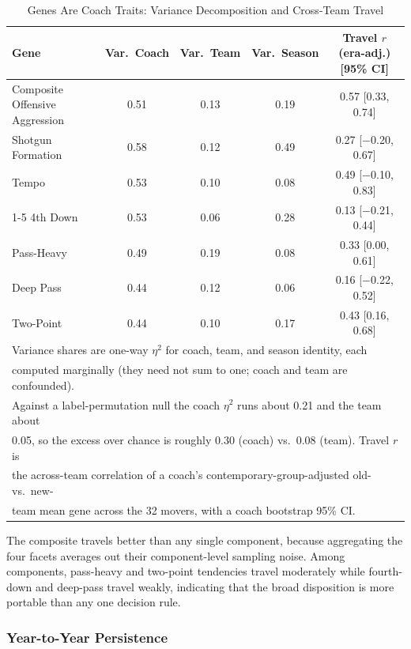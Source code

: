\documentclass[USenglish]{article}
\theoremstyle{dgthm}
\theoremstyle{dgdef}
\begin{document}
\begin{table}[H]
\caption{Genes Are Coach Traits: Variance Decomposition and Cross-Team Travel}
\label{tab:variance}
\begin{tabular}{lcccc}
\toprule
\textbf{Gene} & \textbf{Var.\ Coach} & \textbf{Var.\ Team} & \textbf{Var.\ Season} & \textbf{Travel $r$ (era-adj.) [95\% CI]} \\
\midrule
Composite Offensive Aggression & 0.51 & 0.13 & 0.19 & 0.57 [0.33, 0.74] \\
Shotgun Formation & 0.58 & 0.12 & 0.49 & 0.27 [$-$0.20, 0.67] \\
Tempo & 0.53 & 0.10 & 0.08 & 0.49 [$-$0.10, 0.83] \\
\cmidrule{1-5}
4th Down & 0.53 & 0.06 & 0.28 & 0.13 [$-$0.21, 0.44] \\
Pass-Heavy & 0.49 & 0.19 & 0.08 & 0.33 [0.00, 0.61] \\
Deep Pass & 0.44 & 0.12 & 0.06 & 0.16 [$-$0.22, 0.52] \\
Two-Point & 0.44 & 0.10 & 0.17 & 0.43 [0.16, 0.68] \\
\midrule
\multicolumn{5}{l}{\small Variance shares are one-way $\eta^2$ for coach, team, and season identity, each}\\
\multicolumn{5}{l}{\small computed marginally (they need not sum to one; coach and team are confounded).}\\
\multicolumn{5}{l}{\small Against a label-permutation null the coach $\eta^2$ runs about 0.21 and the team about}\\
\multicolumn{5}{l}{\small 0.05, so the excess over chance is roughly 0.30 (coach) vs.\ 0.08 (team). Travel $r$ is}\\
\multicolumn{5}{l}{\small the across-team correlation of a coach's contemporary-group-adjusted old- vs.\ new-}\\
\multicolumn{5}{l}{\small team mean gene across the 32 movers, with a coach bootstrap 95\% CI.}\\
\bottomrule
\end{tabular}
\end{table}

The composite travels better than any single component, because aggregating the four facets averages out their component-level sampling noise. Among components, pass-heavy and two-point tendencies travel moderately while fourth-down and deep-pass travel weakly, indicating that the broad disposition is more portable than any one decision rule.

\subsubsection{Year-to-Year Persistence}
\label{sec:persistence}
\end{document}
